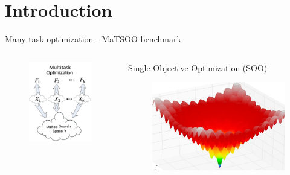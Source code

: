 \section{Introduction}

\begin{frame}{Many task optimization - MaTSOO benchmark}
    \begin{columns}
        \begin{column}{0.4\textwidth}
            \begin{figure}
                \includegraphics[width=\textwidth]{figure/intro/mto.png}
            \end{figure}
        \end{column}
        \begin{column}{0.48\textwidth}
            \begin{block}{Single Objective Optimization (SOO)}
                \begin{figure}
                    \includegraphics[width=0.4\linewidth]{figure/intro/ackley.jpeg}

\end{figure}
\end{block}
\end{column}
\end{columns}
\end{frame}
